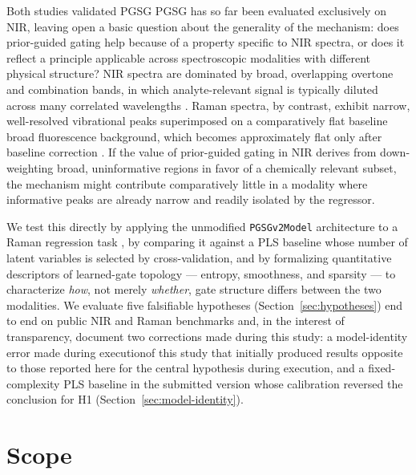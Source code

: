 \documentclass[preprint,12pt]{elsarticle}
\providecommand{\DIFaddtex}[1]{{\protect\color{blue} \sf #1}} %
\providecommand{\DIFdeltex}[1]{{\protect\color{red} \scriptsize #1}} %
\providecommand{\DIFaddbegin}{} %
\providecommand{\DIFaddend}{} %
\providecommand{\DIFdelbegin}{} %
\providecommand{\DIFdelend}{} %
\providecommand{\DIFadd}[1]{\texorpdfstring{\DIFaddtex{#1}}{#1}} %
\providecommand{\DIFdel}[1]{\texorpdfstring{\DIFdeltex{#1}}{}} %
\providecommand{\DIFscaledelfig}{0.5}
\newlength{\DIFdelgraphicswidth} %
\newlength{\DIFdelgraphicsheight} %
\providecommand{\DIFaddincludegraphics}[2][]{{\color{blue}\fbox{\DIFOincludegraphics[#1]{#2}}}} %
\providecommand{\DIFdelincludegraphics}[2][]{%
\sbox{\DIFdelgraphicsbox}{\DIFOincludegraphics[#1]{#2}}%
\settoboxwidth{\DIFdelgraphicswidth}{\DIFdelgraphicsbox} %
\settoboxtotalheight{\DIFdelgraphicsheight}{\DIFdelgraphicsbox} %
\scalebox{\DIFscaledelfig}{%
\parbox[b]{\DIFdelgraphicswidth}{\usebox{\DIFdelgraphicsbox}\\[-\baselineskip] \rule{\DIFdelgraphicswidth}{0em}}\llap{\resizebox{\DIFdelgraphicswidth}{\DIFdelgraphicsheight}{%
\setlength{\unitlength}{\DIFdelgraphicswidth}%
\begin{picture}(1,1)%
\thicklines\linethickness{2pt} %
{\color[rgb]{1,0,0}\put(0,0){\framebox(1,1){}}}%
{\color[rgb]{1,0,0}\put(0,0){\line( 1,1){1}}}%
{\color[rgb]{1,0,0}\put(0,1){\line(1,-1){1}}}%
\end{picture}%
}\hspace*{3pt}}} %
} %
\DeclareRobustCommand{\DIFaddbegin}{\DIFOaddbegin \let\includegraphics\DIFaddincludegraphics} %
\DeclareRobustCommand{\DIFaddend}{\DIFOaddend \let\includegraphics\DIFOincludegraphics} %
\DeclareRobustCommand{\DIFdelbegin}{\DIFOdelbegin \let\includegraphics\DIFdelincludegraphics} %
\DeclareRobustCommand{\DIFdelend}{\DIFOaddend \let\includegraphics\DIFOincludegraphics} %
\begin{document}
\DIFdelbegin \DIFdel{Both studies validated PGSG }\DIFdelend \DIFaddbegin \DIFadd{PGSG has so far been evaluated }\DIFaddend exclusively on NIR, leaving open a basic question about the generality of the mechanism: does prior-guided gating help because of a property specific to NIR spectra, or does it reflect a principle applicable across spectroscopic modalities with different physical structure? NIR spectra are dominated by broad, overlapping overtone and combination bands, in which analyte-relevant signal is typically diluted across many correlated wavelengths \cite{workman2012nir}. Raman spectra, by contrast, exhibit narrow, well-resolved vibrational peaks superimposed on a \DIFdelbegin \DIFdel{comparatively flat baseline }\DIFdelend \DIFaddbegin \DIFadd{broad fluorescence background, which becomes approximately flat only after baseline correction }\DIFaddend \cite{smith2019raman}. If the value of prior-guided gating in NIR derives from down-weighting broad, uninformative regions in favor of a chemically relevant subset, the mechanism might contribute comparatively little in a modality where informative peaks are already narrow and readily isolated by the regressor.

We test this directly by applying the unmodified \texttt{PGSGv2Model} architecture to a Raman regression task\DIFaddbegin \DIFadd{, by comparing it against a PLS baseline whose number of latent variables is selected by cross-validation, }\DIFaddend and by formalizing quantitative descriptors of learned-gate topology --- entropy, smoothness, and sparsity --- to characterize \emph{how}, not merely \emph{whether}, gate structure differs between the two modalities. We evaluate five falsifiable hypotheses (Section~\ref{sec:hypotheses}) end to end on public NIR and Raman benchmarks and, in the interest of transparency, document \DIFaddbegin \DIFadd{two corrections made during this study: }\DIFaddend a model-identity error \DIFdelbegin \DIFdel{made during executionof this study that initially produced results opposite to those reported here for the central hypothesis }\DIFdelend \DIFaddbegin \DIFadd{during execution, and a fixed-complexity PLS baseline in the submitted version whose calibration reversed the conclusion for H1 }\DIFaddend (Section~\ref{sec:model-identity}).

\section{Scope}
\label{sec:scope}
\end{document}
